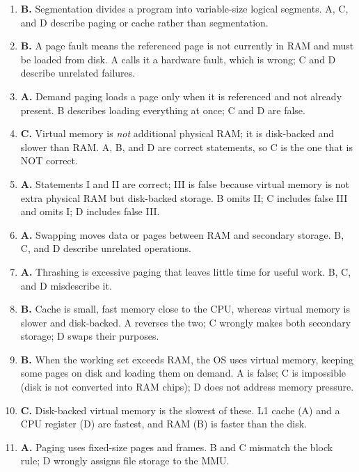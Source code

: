 \begin{enumerate}[label=\textbf{Q\arabic*.}, leftmargin=*]
  uses variable-size logical segments. A and D reverse the two; C wrongly makes
  both fixed-size.
\item \textbf{B.} Segmentation divides a program into variable-size logical
  segments. A, C, and D describe paging or cache rather than segmentation.
\item \textbf{B.} A page fault means the referenced page is not currently in
  RAM and must be loaded from disk. A calls it a hardware fault, which is
  wrong; C and D describe unrelated failures.
\item \textbf{A.} Demand paging loads a page only when it is referenced and not
  already present. B describes loading everything at once; C and D are false.
\item \textbf{C.} Virtual memory is \emph{not} additional physical RAM; it is
  disk-backed and slower than RAM. A, B, and D are correct statements, so C is
  the one that is NOT correct.
\item \textbf{A.} Statements I and II are correct; III is false because virtual
  memory is not extra physical RAM but disk-backed storage. B omits II; C
  includes false III and omits I; D includes false III.
\item \textbf{A.} Swapping moves data or pages between RAM and secondary
  storage. B, C, and D describe unrelated operations.
\item \textbf{A.} Thrashing is excessive paging that leaves little time for
  useful work. B, C, and D misdescribe it.
\item \textbf{B.} Cache is small, fast memory close to the CPU, whereas virtual
  memory is slower and disk-backed. A reverses the two; C wrongly makes both
  secondary storage; D swaps their purposes.
\item \textbf{B.} When the working set exceeds RAM, the OS uses virtual memory,
  keeping some pages on disk and loading them on demand. A is false; C is
  impossible (disk is not converted into RAM chips); D does not address memory
  pressure.
\item \textbf{C.} Disk-backed virtual memory is the slowest of these. L1 cache
  (A) and a CPU register (D) are fastest, and RAM (B) is faster than the disk.
\item \textbf{A.} Paging uses fixed-size pages and frames. B and C mismatch the
  block rule; D wrongly assigns file storage to the MMU.


\end{enumerate}
